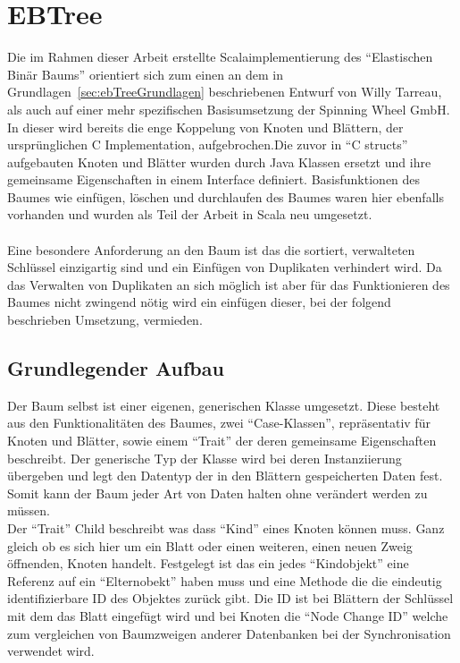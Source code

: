 \documentclass[a4paper,11pt,oneside,%
headsepline,												%
footsepline,												%
bibtotocnumbered									%
]{scrreprt}
\begin{document}
\section{EBTree} %
Die im Rahmen dieser Arbeit erstellte Scalaimplementierung des \enquote{Elastischen Binär Baums} orientiert sich zum einen an dem in Grundlagen~\ref{sec:ebTreeGrundlagen} beschriebenen Entwurf von Willy Tarreau\autocite{Tarreau}, als auch auf einer mehr spezifischen Basisumsetzung der Spinning Wheel GmbH.\\
In dieser wird bereits die enge Koppelung von Knoten und Blättern, der ursprünglichen C Implementation, aufgebrochen.Die zuvor in \enquote{C structs} aufgebauten Knoten und Blätter wurden durch Java Klassen ersetzt und ihre gemeinsame Eigenschaften in einem Interface definiert. Basisfunktionen des Baumes wie einfügen, löschen und durchlaufen des Baumes waren hier ebenfalls vorhanden und wurden als Teil der Arbeit in Scala neu umgesetzt.\\\\
Eine besondere Anforderung an den Baum ist das die sortiert, verwalteten Schlüssel einzigartig sind und ein Einfügen von Duplikaten verhindert wird. Da das Verwalten von Duplikaten an sich möglich ist aber für das Funktionieren des Baumes nicht zwingend nötig wird ein einfügen dieser, bei der folgend beschrieben Umsetzung, vermieden. \\
\subsection{Grundlegender Aufbau}
Der Baum selbst ist einer eigenen, generischen Klasse umgesetzt. Diese besteht aus den Funktionalitäten des Baumes, zwei \enquote{Case-Klassen}, repräsentativ für Knoten und Blätter, sowie einem \enquote{Trait} der deren gemeinsame Eigenschaften beschreibt. Der generische Typ der Klasse wird bei deren Instanziierung übergeben und legt den Datentyp der in den Blättern gespeicherten Daten fest. Somit kann der Baum jeder Art von Daten halten ohne verändert werden zu müssen.\\

Der \enquote{Trait} Child beschreibt was dass \enquote{Kind} eines Knoten können muss. Ganz gleich ob es sich hier um ein Blatt oder einen weiteren, einen neuen Zweig öffnenden, Knoten handelt. Festgelegt ist das ein jedes \enquote{Kindobjekt} eine Referenz auf ein \enquote{Elternobekt} haben muss und eine Methode die die eindeutig identifizierbare ID des Objektes zurück gibt. Die ID ist bei Blättern der Schlüssel mit dem das Blatt eingefügt wird und bei Knoten die \enquote{Node Change ID} welche zum vergleichen von Baumzweigen anderer Datenbanken bei der Synchronisation verwendet wird.\\
\end{document}
